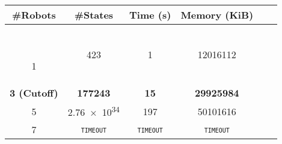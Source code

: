 \documentclass{standalone}
\begin{document}
\begin{scriptsize}
\begin{tabular}{cccccc}
        \toprule
        \#Robots  & \#States & Time (s) & Memory  (KiB) \\
        \hline
        \

        1 & 423  & 1 & 12016112 \\
        \textbf{3 (Cutoff)} & \textbf{177243}  & \textbf{15} & \textbf{29925984} \\
        5 & \num{2.76e34}  & 197 & 50101616 \\
        7 & \texttt{\textsc{timeout}}  & \texttt{\textsc{timeout}} &
        \texttt{\textsc{timeout}} \\ 
        \bottomrule
    \end{tabular}
\end{scriptsize}
\end{document}
